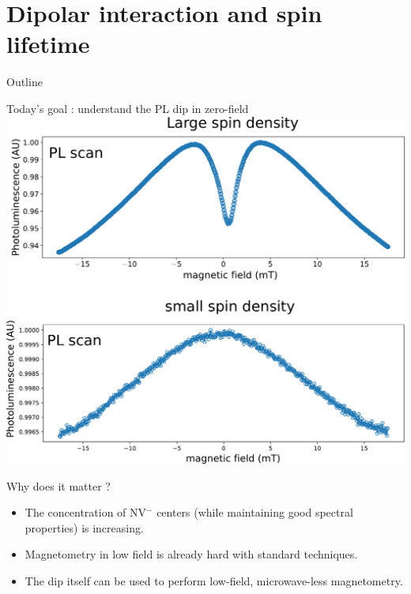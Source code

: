 \documentclass{beamer}
\begin{document}
\section{Dipolar interaction and spin lifetime}
\begin{frame}{Outline}
\tableofcontents[currentsection]
\end{frame}
\begin{frame}{Today's goal : understand the PL dip in zero-field}
\centering
\includegraphics[width=\textwidth,height=0.9\textheight,keepaspectratio]{Slide 1}
\end{frame}
\begin{frame}{Why does it matter ?}
\begin{itemize}
\item The concentration of NV$^-$ centers (while maintaining good spectral properties) is increasing.
\item Magnetometry in low field is already hard with standard techniques.
\item The dip itself can be used to perform low-field, microwave-less magnetometry.
\end{itemize}
\end{frame}
\end{document}
